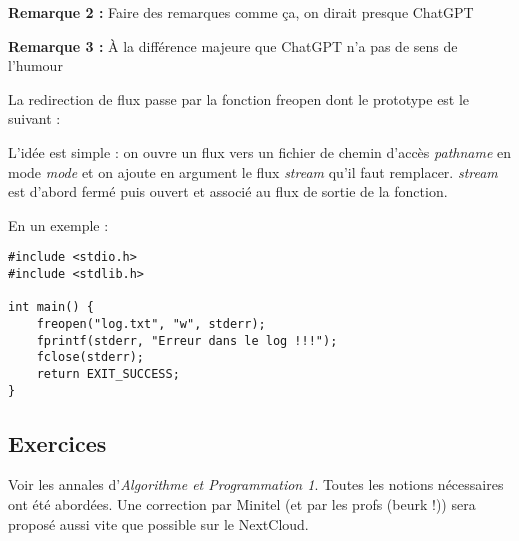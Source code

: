 \documentclass[../../../main.tex]{subfiles}
\begin{document}
\textbf{Remarque 2 :} Faire des remarques comme ça, on dirait presque ChatGPT
 
\textbf{Remarque 3 :} À la différence majeure que ChatGPT n'a pas de sens de l'humour
 
La redirection de flux passe par la fonction \textsf{freopen} dont le prototype est le suivant :
\begin{center}
\end{center}
L'idée est simple : on ouvre un flux vers un fichier de chemin d'accès \textit{pathname} en mode \textit{mode} et on ajoute en argument le flux \textit{stream} qu'il faut remplacer. \textit{stream} est d'abord fermé puis ouvert et associé au flux de sortie de la fonction.
 
En un exemple :
\begin{verbatim}
#include <stdio.h>
#include <stdlib.h>

int main() {
	freopen("log.txt", "w", stderr);
	fprintf(stderr, "Erreur dans le log !!!");
	fclose(stderr);
	return EXIT_SUCCESS;
}
\end{verbatim}
\subsection{Exercices}
Voir les annales d'\textit{Algorithme et Programmation 1}. Toutes les notions nécessaires ont été abordées. Une correction par Minitel (et par les profs (beurk !)) sera proposé aussi vite que possible sur le NextCloud.
\end{document}
